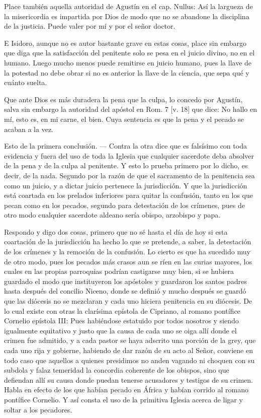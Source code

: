 Place también aquella autoridad de Agustín en el cap. Nullus: Así la largueza de la misericordia es impartida por Dios de modo que no se abandone la disciplina de la justicia. Puede valer por mí y por el señor doctor.

E Isidoro, aunque no es autor bastante grave en estas cosas, place sin embargo que diga que la satisfacción del penitente solo se pesa en el juicio divino, no en el humano. Luego mucho menos puede remitirse en juicio humano, pues la llave de la potestad no debe obrar si no es anterior la llave de la ciencia, que sepa qué y cuánto suelta.

Que ante Dios es más duradera la pena que la culpa, lo concedo por Agustín, salva sin embargo la autoridad del apóstol en Rom. 7 [v. 18] que dice: No hallo en mí, esto es, en mi carne, el bien. Cuya sentencia es que la pena y el pecado se acaban a la vez.

Esto de la primera conclusión. — Contra la otra dice que es falsísimo con toda evidencia y fuera del uso de toda la Iglesia que cualquier sacerdote deba absolver de la pena y de la culpa al penitente. Y esto lo prueba primero por lo dicho, es decir, de la nada. Segundo por la razón de que el sacramento de la penitencia sea como un juicio, y a dictar juicio pertenece la jurisdicción. Y que la jurisdicción está coartada en los prelados inferiores para quitar la confusión, tanto en los que pecan como en los pecados, segundo para detestación de los crímenes, pues de otro modo cualquier sacerdote aldeano sería obispo, arzobispo y papa.

Respondo y digo dos cosas, primero que no sé hasta el día de hoy si esta coartación de la jurisdicción ha hecho lo que se pretende, a saber, la detestación de los crímenes y la remoción de la confusión. Lo cierto es que ha sucedido muy de otro modo, pues los pecados más crasos aun se ríen en las curias mayores, los cuales en las propias parroquias podrían castigarse muy bien, si se hubiera guardado el modo que instituyeron los apóstoles y guardaron los santos padres hasta después del concilio Niceno, donde se definió y mucho después se guardó que las diócesis no se mezclaran y cada uno hiciera penitencia en su diócesis. De \marginpar{\small[379]} lo cual existe con otras la clarísima epístola de Cipriano, al romano pontífice Cornelio epístola III: Pues habiéndose estatuido por todos nosotros y siendo igualmente equitativo y justo que la causa de cada uno se oiga allí donde el crimen fue admitido, y a cada pastor se haya adscrito una porción de la grey, que cada uno rija y gobierne, habiendo de dar razón de su acto al Señor, conviene en todo caso que aquellos a quienes presidimos no anden vagando ni choquen con su subdola y falaz temeridad la concordia coherente de los obispos, sino que defiendan allí su causa donde puedan tenerse acusadores y testigos de su crimen. Habla en efecto de los que habían pecado en África y habían corrido al romano pontífice Cornelio. Y así consta el uso de la primitiva Iglesia acerca de ligar y soltar a los pecadores.


